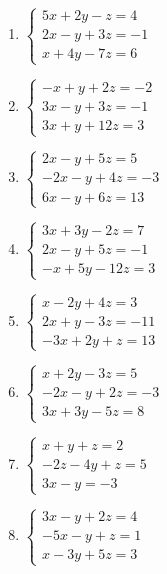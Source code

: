 \begin{enumerate}[topsep=0pt]
	\item $ \begin{cases}
		5x+2y-z=4 \\
		2x-y+3z = -1 \\
		x+4y-7z = 6
	\end{cases} $
	
	\item $ \begin{cases}
		-x + y +2z = -2 \\
		3x-y+3z = -1 \\
		3x+y+12z = 3
	\end{cases} $
	
	\item $ \begin{cases}
		2x - y + 5z = 5 \\
		-2x -y + 4z = -3 \\
		6x -y + 6z = 13
	\end{cases} $
	
	\item $ \begin{cases}
		3x+3y-2z = 7 \\
		2x-y+5z = -1 \\
		-x+5y-12z = 3
	\end{cases} $
	
	\item $ \begin{cases}
			x-2y + 4z = 3 \\
			2x+y-3z = -11 \\
			-3x+2y+z = 13
			\end{cases} $
	
	\item $ \begin{cases}
		x+2y-3z = 5 \\
		-2x-y+2z = -3 \\
		3x+3y-5z=8
	\end{cases} $

	
	\item $ \begin{cases}
		x+y+z= 2 \\
		-2z-4y+z = 5 \\
		3x-y = -3
	\end{cases} $
	
	\item $ \begin{cases}
		3x-y+2z=4\\
		-5x-y+z=1\\
		x-3y+5z=3
	\end{cases} $

\end{enumerate}



